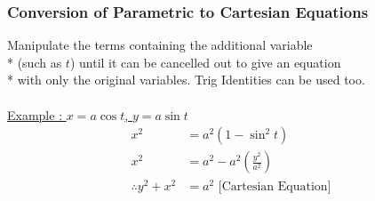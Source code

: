 \documentclass[../main.tex]{subfiles}
\begin{document}
\subsubsection{Conversion of Parametric to Cartesian Equations}
Manipulate the terms containing the additional variable \\*
(such as \(t\)) until it can be cancelled out to give an equation \\*
with only the original variables. Trig Identities can be used too. \\\\
\underline{Example : \(x=a\cos{t}\), \(y=a\sin{t}\)}
\begin{align*}
    \displaystyle x^{2} &= a^{2}\left(1-\sin^{2}{t}\right) \\
    \displaystyle x^{2} &= a^{2} - a^{2}\left(\frac{y^{2}}{a^{2}}\right) \\
    \displaystyle \therefore y^{2} + x^{2} &= a^{2} \text{  [Cartesian Equation]}
\end{align*}
\end{document}
